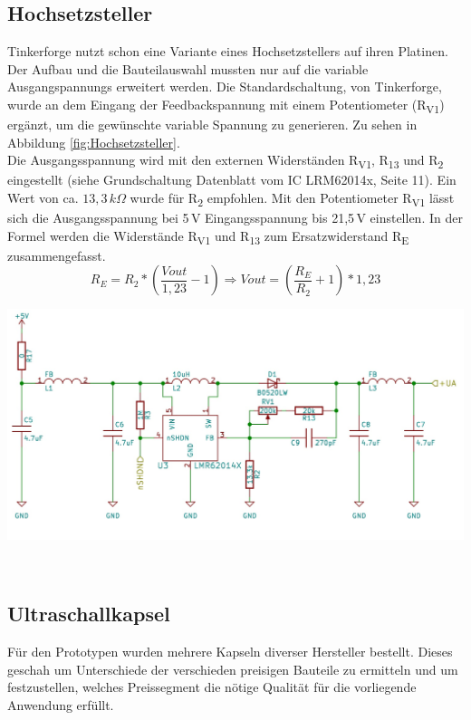 \subsection{Hochsetzsteller}
Tinkerforge nutzt schon eine Variante eines Hochsetzstellers auf ihren Platinen. Der Aufbau und die Bauteilauswahl mussten nur auf die variable Ausgangspannungs erweitert werden. Die Standardschaltung, von Tinkerforge, wurde an dem Eingang der Feedbackspannung mit einem Potentiometer (R\textsubscript{V1}) ergänzt, um die gewünschte variable Spannung zu generieren. Zu sehen in Abbildung \ref{fig:Hochsetzsteller}.\\
Die Ausgangsspannung wird mit den externen Widerständen R\textsubscript{V1}, R\textsubscript{13} und R\textsubscript{2} eingestellt (siehe Grundschaltung Datenblatt vom IC LRM62014x, Seite 11). Ein Wert von ca. \(\displaystyle 13,3\,k\Omega \) wurde für R\textsubscript{2} empfohlen. Mit den Potentiometer R\textsubscript{V1} lässt sich die Ausgangsspannung bei 5\,V Eingangsspannung bis 21,5\,V einstellen. In der Formel werden die Widerstände R\textsubscript{V1} und R\textsubscript{13} zum Ersatzwiderstand R\textsubscript{E} zusammengefasst.
\onehalfspacing \\
\[\displaystyle R_{E}=R_{2}*\left(\frac{Vout}{1,23}-1\right) \Rightarrow Vout=\left(\frac{R_{E}}{R_{2}}+1\right)*1,23\] 
\singlespacing
\begin{center}
\begin{minipage}{1\textwidth}
\includegraphics[width=1\textwidth%
]{Abbildungen/Pumpe.png}
\label{fig:Hochsetzsteller}
\end{minipage}\\
\end{center}

\subsection{Ultraschallkapsel}%
Für den Prototypen wurden mehrere Kapseln diverser Hersteller bestellt. Dieses geschah um Unterschiede der verschieden preisigen Bauteile zu ermitteln und um festzustellen, welches Preissegment die nötige Qualität für die vorliegende Anwendung erfüllt.


